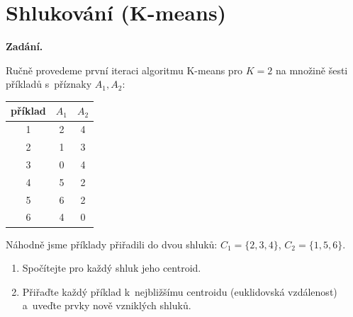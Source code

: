 \section{Shlukování (K-means)}

\noindent\textbf{Zadání.}\par
Ručně provedeme první iteraci algoritmu K-means pro $K = 2$ na množině šesti příkladů s~příznaky
$A_1, A_2$:

\begin{center}
\begin{tabular}{ccc}
\toprule
příklad & $A_1$ & $A_2$ \\
\midrule
1 & 2 & 4 \\
2 & 1 & 3 \\
3 & 0 & 4 \\
4 & 5 & 2 \\
5 & 6 & 2 \\
6 & 4 & 0 \\
\bottomrule
\end{tabular}
\end{center}

Náhodně jsme příklady přiřadili do dvou shluků: $C_1 = \{2,3,4\}$, $C_2 = \{1,5,6\}$.
\begin{enumerate}
  \item Spočítejte pro každý shluk jeho centroid.
  \item Přiřaďte každý příklad k~nejbližšímu centroidu (euklidovská vzdálenost) a~uveďte prvky
    nově vzniklých shluků.
\end{enumerate}

